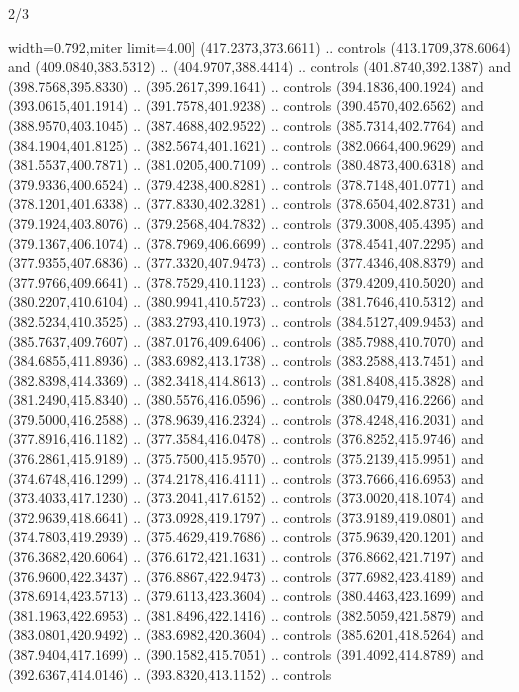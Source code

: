 \begin{flagdescription}{2/3}
\begin{scope}[xshift=0.5\flaglength,yshift=0.5\flagwidth,scale=\flagwidth/562]
\begin{scope}[y=1pt, x=1pt, yscale=-1,shift={(-421.88,-281.25)}]
  width=0.792\lw,miter limit=4.00] (417.2373,373.6611) .. controls
  (413.1709,378.6064) and (409.0840,383.5312) .. (404.9707,388.4414) .. controls
  (401.8740,392.1387) and (398.7568,395.8330) .. (395.2617,399.1641) .. controls
  (394.1836,400.1924) and (393.0615,401.1914) .. (391.7578,401.9238) .. controls
  (390.4570,402.6562) and (388.9570,403.1045) .. (387.4688,402.9522) .. controls
  (385.7314,402.7764) and (384.1904,401.8125) .. (382.5674,401.1621) .. controls
  (382.0664,400.9629) and (381.5537,400.7871) .. (381.0205,400.7109) .. controls
  (380.4873,400.6318) and (379.9336,400.6524) .. (379.4238,400.8281) .. controls
  (378.7148,401.0771) and (378.1201,401.6338) .. (377.8330,402.3281) .. controls
  (378.6504,402.8731) and (379.1924,403.8076) .. (379.2568,404.7832) .. controls
  (379.3008,405.4395) and (379.1367,406.1074) .. (378.7969,406.6699) .. controls
  (378.4541,407.2295) and (377.9355,407.6836) .. (377.3320,407.9473) .. controls
  (377.4346,408.8379) and (377.9766,409.6641) .. (378.7529,410.1123) .. controls
  (379.4209,410.5020) and (380.2207,410.6104) .. (380.9941,410.5723) .. controls
  (381.7646,410.5312) and (382.5234,410.3525) .. (383.2793,410.1973) .. controls
  (384.5127,409.9453) and (385.7637,409.7607) .. (387.0176,409.6406) .. controls
  (385.7988,410.7070) and (384.6855,411.8936) .. (383.6982,413.1738) .. controls
  (383.2588,413.7451) and (382.8398,414.3369) .. (382.3418,414.8613) .. controls
  (381.8408,415.3828) and (381.2490,415.8340) .. (380.5576,416.0596) .. controls
  (380.0479,416.2266) and (379.5000,416.2588) .. (378.9639,416.2324) .. controls
  (378.4248,416.2031) and (377.8916,416.1182) .. (377.3584,416.0478) .. controls
  (376.8252,415.9746) and (376.2861,415.9189) .. (375.7500,415.9570) .. controls
  (375.2139,415.9951) and (374.6748,416.1299) .. (374.2178,416.4111) .. controls
  (373.7666,416.6953) and (373.4033,417.1230) .. (373.2041,417.6152) .. controls
  (373.0020,418.1074) and (372.9639,418.6641) .. (373.0928,419.1797) .. controls
  (373.9189,419.0801) and (374.7803,419.2939) .. (375.4629,419.7686) .. controls
  (375.9639,420.1201) and (376.3682,420.6064) .. (376.6172,421.1631) .. controls
  (376.8662,421.7197) and (376.9600,422.3437) .. (376.8867,422.9473) .. controls
  (377.6982,423.4189) and (378.6914,423.5713) .. (379.6113,423.3604) .. controls
  (380.4463,423.1699) and (381.1963,422.6953) .. (381.8496,422.1416) .. controls
  (382.5059,421.5879) and (383.0801,420.9492) .. (383.6982,420.3604) .. controls
  (385.6201,418.5264) and (387.9404,417.1699) .. (390.1582,415.7051) .. controls
  (391.4092,414.8789) and (392.6367,414.0146) .. (393.8320,413.1152) .. controls

\end{scope}
\end{scope}
\end{flagdescription}

